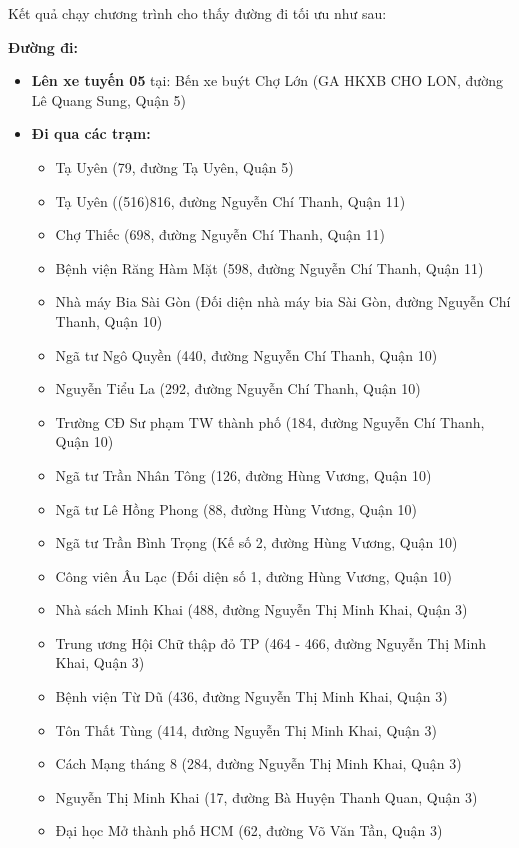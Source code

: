 \documentclass[a4paper,12pt]{article}
\begin{document}
Kết quả chạy chương trình cho thấy đường đi tối ưu như sau:

\textbf{Đường đi:}
\begin{itemize}
    \item \textbf{Lên xe tuyến 05} tại: Bến xe buýt Chợ Lớn (GA HKXB CHO LON, đường Lê Quang Sung, Quận 5)
    
    \item \textbf{Đi qua các trạm:}
    \begin{itemize}
        \item Tạ Uyên (79, đường Tạ Uyên, Quận 5)
        \item Tạ Uyên ((516)816, đường Nguyễn Chí Thanh, Quận 11)
        \item Chợ Thiếc (698, đường Nguyễn Chí Thanh, Quận 11)
        \item Bệnh viện Răng Hàm Mặt (598, đường Nguyễn Chí Thanh, Quận 11)
        \item Nhà máy Bia Sài Gòn (Đối diện nhà máy bia Sài Gòn, đường Nguyễn Chí Thanh, Quận 10)
        \item Ngã tư Ngô Quyền (440, đường Nguyễn Chí Thanh, Quận 10)
        \item Nguyễn Tiểu La (292, đường Nguyễn Chí Thanh, Quận 10)
        \item Trường CĐ Sư phạm TW thành phố (184, đường Nguyễn Chí Thanh, Quận 10)
        \item Ngã tư Trần Nhân Tông (126, đường Hùng Vương, Quận 10)
        \item Ngã tư Lê Hồng Phong (88, đường Hùng Vương, Quận 10)
        \item Ngã tư Trần Bình Trọng (Kế số 2, đường Hùng Vương, Quận 10)
        \item Công viên Âu Lạc (Đối diện số 1, đường Hùng Vương, Quận 10)
        \item Nhà sách Minh Khai (488, đường Nguyễn Thị Minh Khai, Quận 3)
        \item Trung ương Hội Chữ thập đỏ TP (464 - 466, đường Nguyễn Thị Minh Khai, Quận 3)
        \item Bệnh viện Từ Dũ (436, đường Nguyễn Thị Minh Khai, Quận 3)
        \item Tôn Thất Tùng (414, đường Nguyễn Thị Minh Khai, Quận 3)
        \item Cách Mạng tháng 8 (284, đường Nguyễn Thị Minh Khai, Quận 3)
        \item Nguyễn Thị Minh Khai (17, đường Bà Huyện Thanh Quan, Quận 3)
        \item Đại học Mở thành phố HCM (62, đường Võ Văn Tần, Quận 3)

\end{itemize}
\end{itemize}
\end{document}

